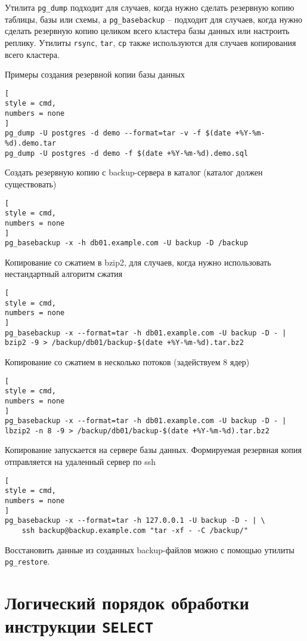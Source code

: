 \documentclass[%
	11pt,
	a4paper,
	utf8,
		]{article}
\begin{document}
Утилита \texttt{pg\_dump} подходит для случаев, когда нужно сделать резервную копию таблицы, базы или схемы, а \texttt{pg\_basebackup} -- подходит для случаев, когда нужно сделать резервную копию целиком всего кластера базы данных или настроить реплику. Утилиты \texttt{rsync}, \texttt{tar}, \texttt{cp} также используются для случаев копирования всего кластера.

Примеры создания резервной копии базы данных
\begin{lstlisting}[
style = cmd,
numbers = none
]
pg_dump -U postgres -d demo --format=tar -v -f $(date +%Y-%m-%d).demo.tar
pg_dump -U postgres -d demo -f $(date +%Y-%m-%d).demo.sql
\end{lstlisting}

Создать резервную копию с backup-сервера в каталог  (каталог должен существовать)
\begin{lstlisting}[
style = cmd,
numbers = none
]
pg_basebackup -x -h db01.example.com -U backup -D /backup

\end{lstlisting}

Копирование со сжатием в bzip2, для случаев, когда нужно использовать нестандартный алгоритм сжатия
\begin{lstlisting}[
style = cmd,
numbers = none
]
pg_basebackup -x --format=tar -h db01.example.com -U backup -D - | bzip2 -9 > /backup/db01/backup-$(date +%Y-%m-%d).tar.bz2
\end{lstlisting}

Копирование со сжатием в несколько потоков (задействуем 8 ядер)
\begin{lstlisting}[
style = cmd,
numbers = none
]
pg_basebackup -x --format=tar -h db01.example.com -U backup -D - | lbzip2 -n 8 -9 > /backup/db01/backup-$(date +%Y-%m-%d).tar.bz2
\end{lstlisting}

Копирование запускается на сервере базы данных. Формируемая резервная копия отправляется на удаленный сервер по ssh
\begin{lstlisting}[
style = cmd,
numbers = none
]
pg_basebackup -x --format=tar -h 127.0.0.1 -U backup -D - | \
    ssh backup@backup.example.com "tar -xf - -C /backup/"
\end{lstlisting}

Восстановить данные из созданных backup-файлов можно с помощью утилиты \texttt{pg\_restore}.




\section{Логический порядок обработки инструкции \texttt{SELECT}}
\end{document}

